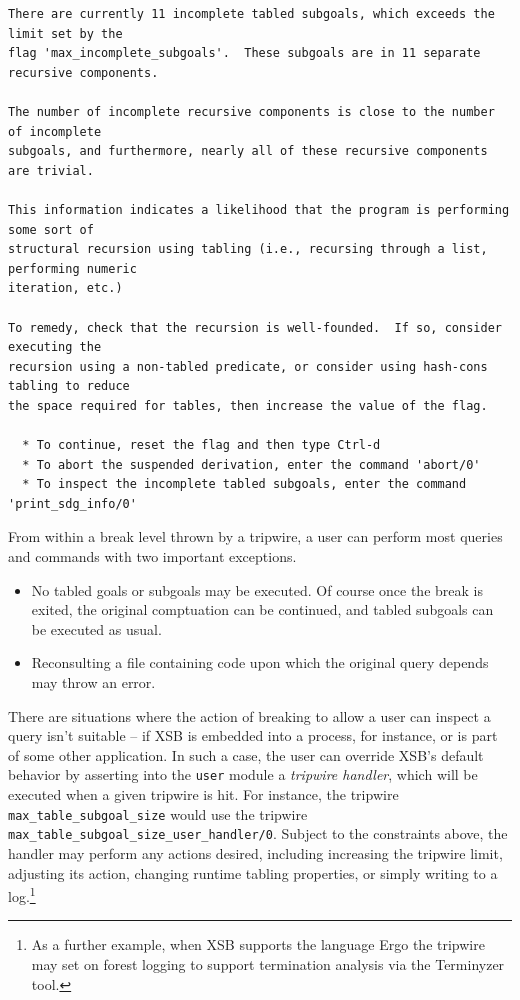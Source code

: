 \begin{small}
\begin{verbatim}
There are currently 11 incomplete tabled subgoals, which exceeds the limit set by the 
flag 'max_incomplete_subgoals'.  These subgoals are in 11 separate recursive components.

The number of incomplete recursive components is close to the number of incomplete 
subgoals, and furthermore, nearly all of these recursive components are trivial.

This information indicates a likelihood that the program is performing some sort of 
structural recursion using tabling (i.e., recursing through a list, performing numeric 
iteration, etc.)

To remedy, check that the recursion is well-founded.  If so, consider executing the 
recursion using a non-tabled predicate, or consider using hash-cons tabling to reduce 
the space required for tables, then increase the value of the flag.

  * To continue, reset the flag and then type Ctrl-d
  * To abort the suspended derivation, enter the command 'abort/0'
  * To inspect the incomplete tabled subgoals, enter the command 'print_sdg_info/0'
\end{verbatim}
\end{small}

From within a break level thrown by a tripwire, a user can perform
 most queries and commands with two important exceptions.

\begin{itemize}
\item No tabled goals or subgoals may be executed.  Of course once the
 break is exited, the original comptuation can be continued, and
 tabled subgoals can be executed as usual.
\item Reconsulting a file containing code upon which the original
 query depends may throw an error.
\end{itemize}

There are situations where the action of breaking to allow a user can
 inspect a query isn't suitable -- if XSB is embedded into a process,
 for instance, or is part of some other application.  In such a case,
 the user can override XSB's default behavior by asserting into the
 {\tt user} module a {\em tripwire handler}, which will be executed
 when a given tripwire is hit.  For instance, the tripwire {\tt
 max\_table\_subgoal\_size} would use the tripwire {\tt
 max\_table\_subgoal\_size\_user\_handler/0}.  Subject to the
 constraints above, the handler may perform any actions desired,
 including increasing the tripwire limit, adjusting its action,
 changing runtime tabling properties, or simply writing to a
 log.\footnote{As a further example, when XSB supports the language
 Ergo the tripwire may set on forest logging to support termination
 analysis via the Terminyzer tool.}


